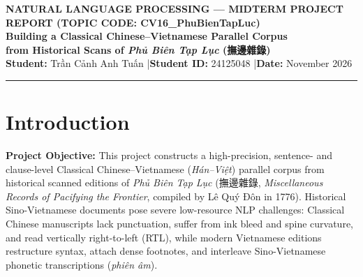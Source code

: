 \documentclass[a4paper]{article}
\begin{document}
\vspace{-0.45cm}
\begin{center}
  {\footnotesize\bfseries\sffamily\textcolor{secondary}{NATURAL LANGUAGE PROCESSING --- MIDTERM PROJECT REPORT (TOPIC CODE: CV16\_PhuBienTapLuc)}}\\[1.5pt]
  {\Large\bfseries\textcolor{primary}{Building a Classical Chinese--Vietnamese Parallel Corpus\\from Historical Scans of \textit{Phủ Biên Tạp Lục} (撫邊雜錄)}}\\[3pt]
  {\small \textbf{Student:} Trần Cảnh Anh Tuấn \quad|\quad \textbf{Student ID:} 24125048 \quad|\quad \textbf{Date:} November 2026}
\end{center}
\vspace{-6pt}
\noindent\textcolor{bordercol}{\rule{\textwidth}{0.6pt}}
\vspace{-7pt}

\section{Introduction}
\textbf{Project Objective:} This project constructs a high-precision, sentence- and clause-level Classical Chinese--Vietnamese (\textit{Hán--Việt}) parallel corpus from historical scanned editions of \textit{Phủ Biên Tạp Lục} (撫邊雜錄, \textit{Miscellaneous Records of Pacifying the Frontier}, compiled by Lê Quý Đôn in 1776). Historical Sino-Vietnamese documents pose severe low-resource NLP challenges: Classical Chinese manuscripts lack punctuation, suffer from ink bleed and spine curvature, and read vertically right-to-left (RTL), while modern Vietnamese editions restructure syntax, attach dense footnotes, and interleave Sino-Vietnamese phonetic transcriptions (\textit{phiên âm}).
\end{document}
